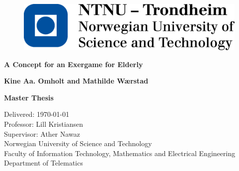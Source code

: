 \documentclass[b5paper,twoside,openright,11pt]{report}
\begin{document}
\begin{flushleft}
\begin{figure}[htb]
\includegraphics[scale=0.6]{NTNU-logo}
\end{figure}
\bigskip
\bigskip
\bigskip
\bigskip
\begin{huge}
\textbf{A Concept for an Exergame for Elderly}\\
\end{huge} 
\bigskip
\bigskip
\bigskip
\bigskip
\bigskip
\bigskip
\bigskip
\begin{Large}
\textbf{Kine Aa. Omholt and Mathilde Wærstad \\}
\end{Large}
\bigskip
\bigskip
\bigskip
\bigskip
\bigskip
\bigskip
\begin{large}
\textbf{Master Thesis\\}
\end{large}
Delivered: \today\\
Professor: Lill Kristiansen\\
Supervisor: Ather Nawaz\\
\bigskip
\bigskip
\bigskip
\bigskip
\bigskip
Norwegian University of Science and Technology\\ 
Faculty of Information Technology, Mathematics and Electrical Engineering\\
Department of Telematics
\end{flushleft}
\cleardoublepage
\end{document}
